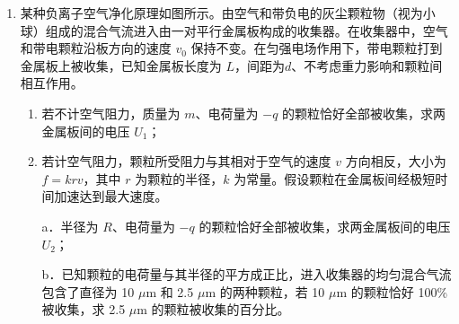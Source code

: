 \documentclass[\gkver]{gaokaozhenti}
\begin{document}
\begin{enumerate}
{$v = \sqrt{\frac{10kI^{2}Ls}{m}}$
}

\item
某种负离子空气净化原理如图所示。由空气和带负电的灰尘颗粒物（视为小球）组成的混合气流进入由一对平行金属板构成的收集器。在收集器中，空气和带电颗粒沿板方向的速度 $v_{0}$ 保持不变。在匀强电场作用下，带电颗粒打到金属板上被收集，已知金属板长度为 $L$，间距为$d$、不考虑重力影响和颗粒间相互作用。
\begin{enumerate}
	\item
	若不计空气阻力，质量为 $m$、电荷量为 $- q$ 的颗粒恰好全部被收集，求两金属板间的电压 $U_{1}$；
	\item
	若计空气阻力，颗粒所受阻力与其相对于空气的速度 $v$ 方向相反，大小为 $f = krv$，其中 $r$ 为颗粒的半径，$k$ 为常量。假设颗粒在金属板间经极短时间加速达到最大速度。

	a．半径为 $R$、电荷量为 $- q$ 的颗粒恰好全部被收集，求两金属板间的电压 $U_{2}$；

	b．已知颗粒的电荷量与其半径的平方成正比，进入收集器的均匀混合气流包含了直径为 10 $\mu$m 和 2.5 $\mu$m 的两种颗粒，若 10 $\mu$m 的颗粒恰好 100\% 被收集，求 2.5 $\mu$m 的颗粒被收集的百分比。
\end{enumerate}
\end{enumerate}
\end{document}
